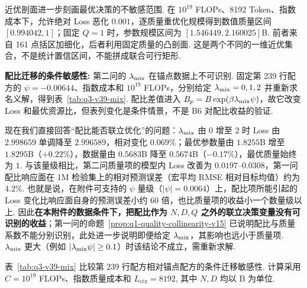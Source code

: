 近优剖面进一步刻画最优决策的不敏感范围. 在 $10^{19}$ FLOPs、8192 Token、指数成本下，允许绝对 Loss 恶化 $0.001$，逐质量重优化规模得到数值质量区间 $[0.994042,1]$；固定 $Q=1$ 时，参数规模区间为 $[1.546449,2.160025]$B. 前者来自 161 点括区加细化，后者利用固定质量的凸剖面. 这是两个不同的一维近优集合，不是统计置信区间，不能拼成联合可行矩形.


\textbf{配比迁移的条件敏感性:}
第二问的 $\lambda_{\rm mix}$ 在锚点数据上不可识别. 固定第 239 行配方的 $\psi=-0.00644$、指数成本和 $10^{19}$ FLOPs，分别给定 $\lambda_{\rm mix}=0,1,2$ 并重新求名义解，得到表~\ref{tab:q3-v39-mix}. 配比差值进入 $B_p=B\exp(\beta\lambda_{\rm mix}\psi)$，故它改变 Loss 和最优资源比，但表列变化是条件情景，不是 B6 对配比收益的验证. 

现在我们直接回答“配比能否联立优化”的问题：$\lambda_{\rm mix}$ 由 $0$ 增至 $2$ 时 Loss 由 $2.998659$ 单调降至 $2.996589$，相对变化 $0.069\%$；最优参数量由 $1.8255$B 增至 $1.8295$B（$+0.22\%$），数据量由 $0.5683$B 降至 $0.5674$B（$-0.17\%$），最优质量始终为 $1$. 与该量级相比，第二问质量项的模型内 Loss 改善为 $0.0197$--$0.0308$，第一问配比响应面在 1M 检验集上的相对预测误差（宏平均 RMSE 相对目标均值）约为 $4.2\%$. 也就是说，在附件可支持的 $\psi$ 量级（$|\psi|=0.0064$）上，配比项所能引起的 Loss 变化比响应面自身的预测误差小约 $60$ 倍，也比质量项的收益小一个数量级以上. 因此\textbf{在本附件的数据条件下，把配比作为 $N,D,Q$ 之外的联立决策变量没有可识别的收益}；第一问的命题~\ref{prop:q1-quality-collinearity-v15} 已说明配比与质量系数不能分别识别，此处进一步说明即便给定 $\lambda_{\rm mix}$，其影响也远小于质量项. $\lambda_{\rm mix}$ 更大（例如 $|\lambda_{\rm mix}\psi|\geq 0.1$）时该结论不成立，需重新求解. 

表~\ref{tab:q3-v39-mix} 比较第 239 行配方相对锚点配方的条件迁移敏感性. 计算采用 $C=10^{19}$ FLOPs、指数质量成本和 $L_{\mathrm{ctx}}=8192$, 其中 $N,D$ 均以 $\text{B}$ 为单位.
